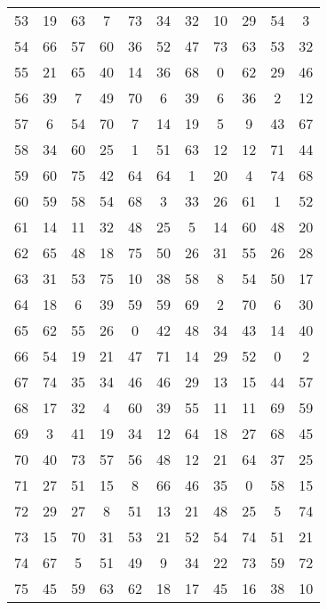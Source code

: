 \begin{table}
\begin{tabular}{c c c c c c c c c c c }
53 & 19 & 63 & 7 & 73 & 34 & 32 & 10 & 29 & 54 & 3 \\
54 & 66 & 57 & 60 & 36 & 52 & 47 & 73 & 63 & 53 & 32 \\
55 & 21 & 65 & 40 & 14 & 36 & 68 & 0 & 62 & 29 & 46 \\
56 & 39 & 7 & 49 & 70 & 6 & 39 & 6 & 36 & 2 & 12 \\
57 & 6 & 54 & 70 & 7 & 14 & 19 & 5 & 9 & 43 & 67 \\
58 & 34 & 60 & 25 & 1 & 51 & 63 & 12 & 12 & 71 & 44 \\
59 & 60 & 75 & 42 & 64 & 64 & 1 & 20 & 4 & 74 & 68 \\
60 & 59 & 58 & 54 & 68 & 3 & 33 & 26 & 61 & 1 & 52 \\
61 & 14 & 11 & 32 & 48 & 25 & 5 & 14 & 60 & 48 & 20 \\
62 & 65 & 48 & 18 & 75 & 50 & 26 & 31 & 55 & 26 & 28 \\
63 & 31 & 53 & 75 & 10 & 38 & 58 & 8 & 54 & 50 & 17 \\
64 & 18 & 6 & 39 & 59 & 59 & 69 & 2 & 70 & 6 & 30 \\
65 & 62 & 55 & 26 & 0 & 42 & 48 & 34 & 43 & 14 & 40 \\
66 & 54 & 19 & 21 & 47 & 71 & 14 & 29 & 52 & 0 & 2 \\
67 & 74 & 35 & 34 & 46 & 46 & 29 & 13 & 15 & 44 & 57 \\
68 & 17 & 32 & 4 & 60 & 39 & 55 & 11 & 11 & 69 & 59 \\
69 & 3 & 41 & 19 & 34 & 12 & 64 & 18 & 27 & 68 & 45 \\
70 & 40 & 73 & 57 & 56 & 48 & 12 & 21 & 64 & 37 & 25 \\
71 & 27 & 51 & 15 & 8 & 66 & 46 & 35 & 0 & 58 & 15 \\
72 & 29 & 27 & 8 & 51 & 13 & 21 & 48 & 25 & 5 & 74 \\
73 & 15 & 70 & 31 & 53 & 21 & 52 & 54 & 74 & 51 & 21 \\
74 & 67 & 5 & 51 & 49 & 9 & 34 & 22 & 73 & 59 & 72 \\
75 & 45 & 59 & 63 & 62 & 18 & 17 & 45 & 16 & 38 & 10 \\
\hline
\end{tabular}
\end{table}